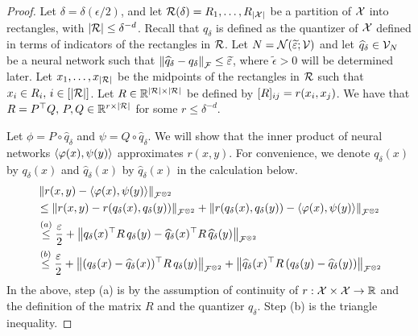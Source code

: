 \begin{proof}
    Let $\delta = \delta(\epsilon / 2)$, and let ${\mathcal{R}}(\delta) = {R_1, \ldots, R_{\left\lvert{\mathcal{X}}\right\rvert}}$ be a partition of ${\mathcal{X}}$ into rectangles, with $\left\lvert{\mathcal{R}}\right\rvert \leq \delta^{-d}$. Recall that $q_\delta$ is defined as the quantizer of ${\mathcal{X}}$ defined in terms of indicators of the rectangles in ${\mathcal{R}}$. Let $N = {\mathcal{N}}(\widetilde{\varepsilon}; {\mathcal{V}})$ and let $\widehat{q}_\delta \in {\mathcal{V}}_N$ be a neural network such that $\left\lVert\widehat{q}_\delta - q_\delta\right\rVert_{\mathcal{F}} \leq \widetilde{\varepsilon}$, where $\tilde{\epsilon} > 0$ will be determined later. Let $x_1, \ldots, x_{\lvert{\mathcal{R}}\rvert}$ be the midpoints of the rectangles in ${\mathcal{R}}$ such that $x_i \in R_i,\, i \in [\lvert{\mathcal{R}}\rvert]$. Let $R \in \mathbb{R}^{\lvert{\mathcal{R}}\rvert \times \lvert{\mathcal{R}}\rvert}$ be defined by $[R]_{ij} = r(x_i, x_j)$. We have that $R = P^\top Q,\, P,Q \in \mathbb{R}^{r \times \lvert{\mathcal{R}}\rvert}$ for some $r \leq \delta^{-d}$.

    Let $\phi = P \circ \hat{q}_\delta$ and $\psi = Q \circ \hat{q}_{\delta}$. We will show that the inner product of neural networks $\left \langle \varphi(x), \psi(y) \right\rangle$ approximates $r(x, y)$. For convenience, we denote $q_\delta(x)$ by $q_\delta(x)$ and $\hat{q}_\delta(x)$ by $\hat{q}_\delta(x)$ in the calculation below.
    \begin{align*}
        &\norm{r(x,y) - \iprod{\phi(x)}{\psi(y)}}_{\calF^{\otimes 2}} \\
        &\leq \norm{r(x, y) - r(q_\delta(x), q_\delta(y))}_{\calF^{\otimes 2}} + \norm{r(q_\delta(x), q_\delta(y)) - \iprod{\phi(x)}{\psi(y)}}_{\calF^{\otimes 2}}\\
        &\stepa{\leq} \frac{\epsilon}{2} + \norm{q_{\delta}(x)^\top R\, q_{\delta}(y) - \hat{q}_{\delta}(x)^\top R\, \hat{q}_{\delta}(y)}_{\calF^{\otimes 2}}\\
        &\stepb{\leq} \frac{\epsilon}{2} + \norm{(q_\delta(x) - \hat{q}_\delta(x))^\top R\, q_\delta(y)}_{\calF^{\otimes 2}} + \norm{\hat{q}_\delta(x)^\top R\, (q_\delta(y) - \hat{q}_\delta(y))}_{\calF^{\otimes 2}}
    \end{align*}
    In the above, step (a) is by the assumption of continuity of $r: {\mathcal{X}} \times {\mathcal{X}} \to \mathbb{R}$ and the definition of the matrix $R$ and the quantizer $q_\delta$. Step (b) is the triangle inequality.


\end{proof}
